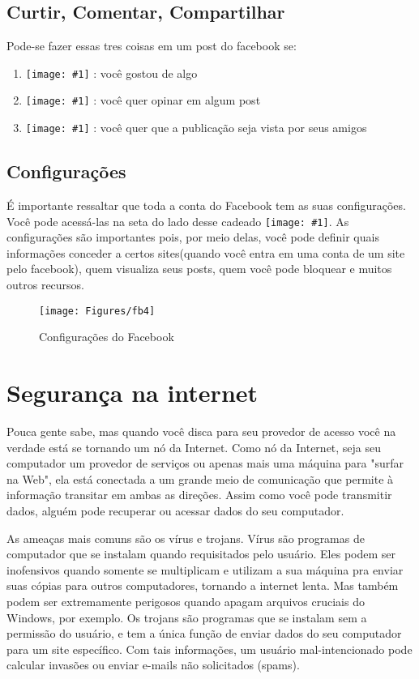 \documentclass[hidelinks,12pt]{article}
\newcommand{\icon}[1]{\texttt{[image: \#1]}}
\begin{document}
		\subsection{Curtir, Comentar, Compartilhar}

			Pode-se fazer essas tres coisas em um post do facebook se:

		\begin{enumerate}
			\item  \icon{Figures/curtir} : você gostou de algo
			\item  \icon{Figures/comentar} : você quer opinar em algum post
			\item  \icon{Figures/compartilhar} : você quer que a publicação seja vista por seus amigos
		\end{enumerate}

		\subsection{Configurações}

		É importante ressaltar que toda a conta do Facebook tem as suas configurações. Você pode acessá-las na seta do lado desse cadeado \icon{Figures/fb5}.
		As configurações são importantes pois, por meio delas,  você pode definir quais informações conceder a certos sites(quando você entra em uma conta de um site pelo facebook), quem visualiza seus posts, quem você pode bloquear e muitos outros recursos.

		\begin{figure}[!h]
			\centering
			\texttt{[image: Figures/fb4]}
			\label{fig:config}
			\caption{Configurações do Facebook}
		\end{figure}
	
	\newpage

	\section{Segurança na internet}

	Pouca gente sabe, mas quando você disca para seu provedor de acesso você na verdade está se tornando um nó da Internet. Como nó da Internet, seja seu computador um provedor de serviços ou apenas mais uma máquina para "surfar na Web", ela está conectada a um grande meio de comunicação que permite à informação transitar em ambas as direções. Assim como você pode transmitir dados, alguém pode recuperar ou acessar dados do seu computador.

	As ameaças mais comuns são os vírus e trojans. Vírus são programas de computador que se instalam quando requisitados pelo usuário. Eles podem ser inofensivos quando somente se multiplicam e utilizam a sua máquina pra enviar suas cópias para outros computadores, tornando a internet lenta. Mas também podem ser extremamente perigosos quando apagam arquivos cruciais do Windows, por exemplo. Os trojans são programas que se instalam sem a permissão do usuário, e tem a única função de enviar dados do seu computador para um site específico. Com tais informações, um usuário mal-intencionado pode calcular invasões ou enviar e-mails não solicitados (spams).
\end{document}
